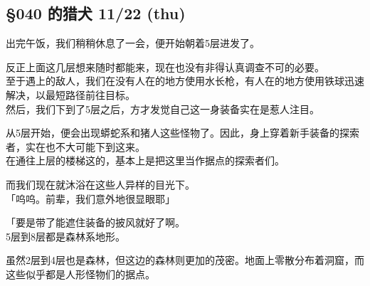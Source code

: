 \subsection{§040 的猎犬 11/22 (thu)}

出完午饭，我们稍稍休息了一会，便开始朝着5层进发了。

反正上面这几层想来随时都能来，现在也没有非得认真调查不可的必要。\\

至于遇上的敌人，我们在没有人在的地方使用水长枪，有人在的地方使用铁球迅速解决，以最短路径前往目标。\\

然后，我们下到了5层之后，方才发觉自己这一身装备实在是惹人注目。

从5层开始，便会出现蟒蛇系和猪人这些怪物了。因此，身上穿着新手装备的探索者，实在也不大可能下到这来。\\

在通往上层的楼梯这的，基本上是把这里当作据点的探索者们。

而我们现在就沐浴在这些人异样的目光下。\\

「呜呜。前辈，我们意外地很显眼耶」

「要是带了能遮住装备的披风就好了啊。\\

5层到8层都是森林系地形。

虽然2层到4层也是森林，但这边的森林则更加的茂密。地面上零散分布着洞窟，而这些似乎都是人形怪物们的据点。\\

